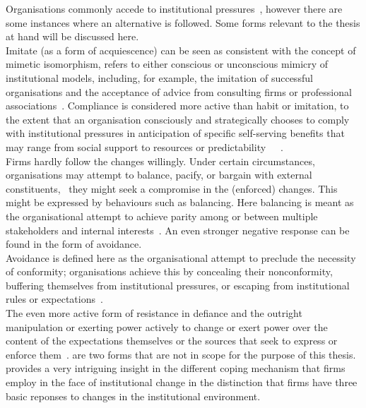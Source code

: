 Organisations commonly accede to institutional pressures~\cite{Oliver:1991tm}, however there are some instances where an alternative is followed. 
Some forms relevant to the thesis at hand will be discussed here.\\
Imitate (as a form of acquiescence) can be seen as consistent with the concept of mimetic isomorphism, refers to either conscious or unconscious mimicry of institutional models, including, for example, the imitation of successful organisations and the acceptance of advice from consulting firms or professional associations~\cite{DiMaggio:1983wt}.
Compliance is considered more active than habit or imitation, to the extent that an organisation consciously and strategically chooses to comply with institutional pressures in anticipation of specific self-serving benefits that may range from social support to resources or predictability~\cite{DiMaggio:1983wt}~\cite{Meyer:1978if}~\cite{Pfeffer:2003wp}.\\
Firms hardly follow the changes willingly.  
Under certain circumstances, organisations may attempt to balance, pacify, or bargain with external constituents,~\cite{Oliver:1991tm} they might seek a compromise in the (enforced) changes. 
This might be expressed by behaviours such as balancing. 
Here balancing is meant as the organisational attempt to achieve parity among or between multiple stakeholders and internal interests~\cite{Oliver:1991tm}.
An even stronger negative response can be found in the form of avoidance. \\
Avoidance is defined here as the organisational attempt to preclude the necessity of conformity; organisations achieve this by concealing their nonconformity, buffering themselves from institutional pressures, or escaping from institutional rules or expectations~\cite{Oliver:1991tm}.\\
The even more active form of resistance in defiance and the outright manipulation or exerting power actively to change or exert power over the content of the expectations themselves or the sources that seek to express or enforce them~\cite{Oliver:1991tm}.  are two forms that are not in scope for the purpose of this thesis.\\
 
\cite{Cantwell:2009hg} provides a very intriguing insight in the different coping mechanism that firms employ in the face of institutional change in the distinction that firms have three basic reponses to changes in the institutional environment.

